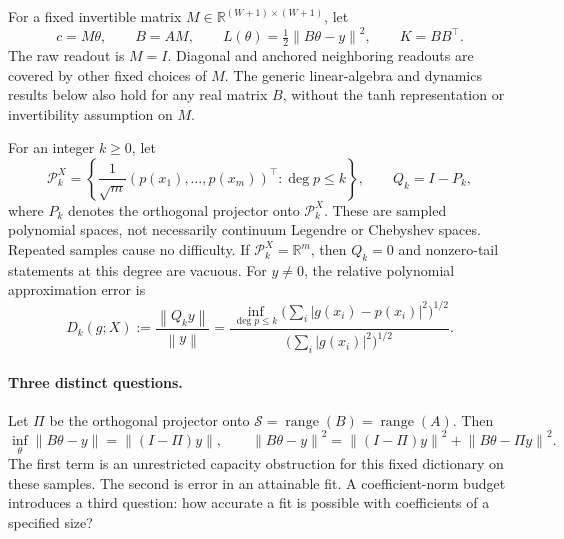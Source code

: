 \documentclass[11pt,letterpaper]{article}
\newcommand{\bsaNorm}[1]{\left\lVert #1\right\rVert}
\newcommand{\bsaRR}{\mathbb R}
\DeclareMathOperator{\bsaRange}{range}
\theoremstyle{remark}
\theoremstyle{plain}
\begin{document}
For a fixed invertible matrix $M\in\bsaRR^{(W+1)\times(W+1)}$, let
\begin{equation}
 c=M\theta,\qquad B=AM,\qquad
 L(\theta)=\tfrac12\bsaNorm{B\theta-y}^2,\qquad K=BB^\top.
 \label{bsa:eq:coordinates}
\end{equation}
The raw readout is $M=I$. Diagonal and anchored neighboring readouts are covered by other fixed choices of $M$. The generic linear-algebra and dynamics results below also hold for any real matrix $B$, without the tanh representation or invertibility assumption on $M$.

For an integer $k\ge0$, let
\begin{equation}
 \mathcal P_k^X
 =\left\{\frac1{\sqrt m}(p(x_1),\ldots,p(x_m))^\top:\deg p\le k\right\},
 \qquad Q_k=I-P_k,
 \label{bsa:eq:polynomial-space}
\end{equation}
where $P_k$ denotes the orthogonal projector onto $\mathcal P_k^X$.
These are sampled polynomial spaces, not necessarily continuum Legendre or Chebyshev spaces. Repeated samples cause no difficulty. If $\mathcal P_k^X=\bsaRR^m$, then $Q_k=0$ and nonzero-tail statements at this degree are vacuous. For $y\ne0$, the relative polynomial approximation error is
\begin{equation}
 D_k(g;X):=\frac{\bsaNorm{Q_ky}}{\bsaNorm y}
 =\frac{\inf_{\deg p\le k}\bigl(\sum_i|g(x_i)-p(x_i)|^2\bigr)^{1/2}}
 {\bigl(\sum_i|g(x_i)|^2\bigr)^{1/2}}.
 \label{bsa:eq:target-tail}
\end{equation}

\paragraph{Three distinct questions.}
Let $\Pi$ be the orthogonal projector onto $\mathcal S=\bsaRange(B)=\bsaRange(A)$. Then
\begin{equation}
 \inf_\theta\bsaNorm{B\theta-y}=\bsaNorm{(I-\Pi)y},\qquad
 \bsaNorm{B\theta-y}^2
 =\bsaNorm{(I-\Pi)y}^2+\bsaNorm{B\theta-\Pi y}^2.
 \label{bsa:eq:capacity-split}
\end{equation}
The first term is an unrestricted capacity obstruction for this fixed dictionary on these samples. The second is error in an attainable fit. A coefficient-norm budget introduces a third question: how accurate a fit is possible with coefficients of a specified size?
\end{document}
